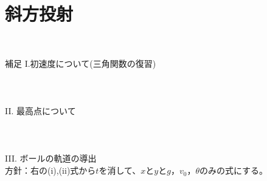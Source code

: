 \documentclass[11pt,twoside]{article}
\begin{document}
	\section{斜方投射}
		\begin{minipage}[t]{0.44\linewidth}
			\\
			\begin{itembox}[l]{補足}
				I.初速度について(三角関数の復習)\\\\\\\\
				II. 最高点について\\\\\\\\
				III. ボールの軌道の導出\\
				\to 方針：右の(i),(ii)式から$t$を消して、$x$と$y$と$g$，$v_0$，$\theta$のみの式にする。\\\\\\\\\\\\\\\\\\
			\end{itembox}
		\end{minipage}
		\hfill	
\end{document}
